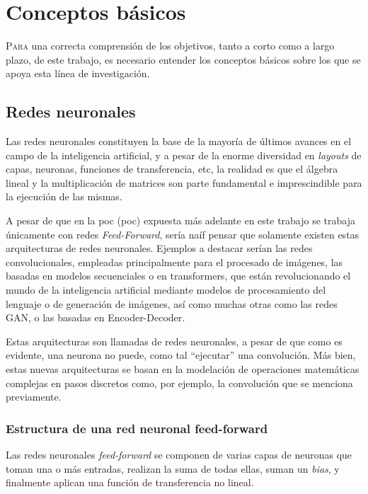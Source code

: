 \chapter{Conceptos básicos}
\label{chap:conceptos_basicos}

\lettrine{P}{ara} una correcta comprensión de los objetivos, tanto a corto como a largo plazo, de este trabajo, es necesario entender los conceptos básicos sobre los que se apoya esta línea de investigación.

\section{Redes neuronales}
\label{sec:redes_neuronales}
Las redes neuronales constituyen la base de la mayoría de últimos avances en el campo de la inteligencia artificial, y a pesar de la enorme diversidad en \textit{layouts} de capas, neuronas, funciones de transferencia, etc, la realidad es que el álgebra lineal y la multiplicación de matrices son parte fundamental e imprescindible para la ejecución de las mismas. \cite[Figure 3.4]{deep_learning_for_computer_architects}

A pesar de que en la \acrshort{poc} (\acrlong{poc}) expuesta más adelante en este trabajo se trabaja únicamente con redes \textit{Feed-Forward}, sería naíf pensar que solamente existen estas arquitecturas de redes neuronales. Ejemplos a destacar serían las redes convolucionales, empleadas principalmente para el procesado de imágenes, las basadas en modelos secuenciales o en transformers, que están revolucionando el mundo de la inteligencia artificial mediante modelos de procesamiento del lenguaje o de generación de imágenes, así como muchas otras como las redes GAN, o las basadas en Encoder-Decoder.

Estas arquitecturas son llamadas de redes neuronales, a pesar de que como es evidente, una neurona no puede, como tal ``ejecutar'' una convolución. Más bien, estas nuevas arquitecturas se basan en la modelación de operaciones matemáticas complejas en pasos discretos como, por ejemplo, la convolución que se menciona previamente.

\subsection{Estructura de una red neuronal feed-forward}
\label{ssec:estructura_red_neuronal_ff}
Las redes neuronales \textit{feed-forward} se componen de varias capas de neuronas que toman una o más entradas, realizan la suma de todas ellas, suman un \textit{bias}, y finalmente aplican una función de transferencia no lineal.

